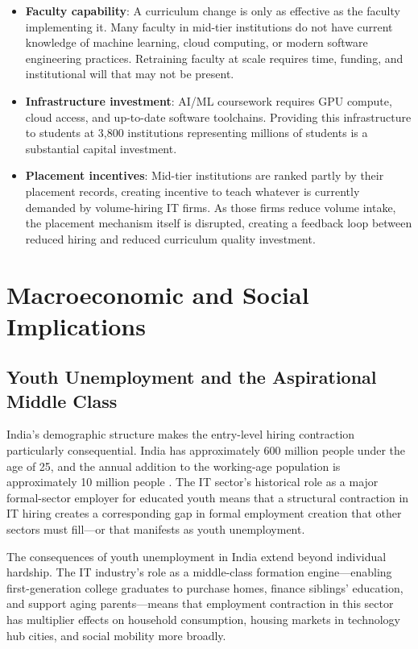 \documentclass[conference]{IEEEtran}
\begin{document}
\begin{itemize}
    \item \textbf{Faculty capability}: A curriculum change is only as effective as the faculty implementing it. Many faculty in mid-tier institutions do not have current knowledge of machine learning, cloud computing, or modern software engineering practices. Retraining faculty at scale requires time, funding, and institutional will that may not be present.
    \item \textbf{Infrastructure investment}: AI/ML coursework requires GPU compute, cloud access, and up-to-date software toolchains. Providing this infrastructure to students at 3,800 institutions representing millions of students is a substantial capital investment.
    \item \textbf{Placement incentives}: Mid-tier institutions are ranked partly by their placement records, creating incentive to teach whatever is currently demanded by volume-hiring IT firms. As those firms reduce volume intake, the placement mechanism itself is disrupted, creating a feedback loop between reduced hiring and reduced curriculum quality investment.
\end{itemize}

\section{Macroeconomic and Social Implications}
\label{sec:macro}

\subsection{Youth Unemployment and the Aspirational Middle Class}

India's demographic structure makes the entry-level hiring contraction particularly consequential. India has approximately 600 million people under the age of 25, and the annual addition to the working-age population is approximately 10 million people \cite{worldbank2024india}. The IT sector's historical role as a major formal-sector employer for educated youth means that a structural contraction in IT hiring creates a corresponding gap in formal employment creation that other sectors must fill---or that manifests as youth unemployment.

The consequences of youth unemployment in India extend beyond individual hardship. The IT industry's role as a middle-class formation engine---enabling first-generation college graduates to purchase homes, finance siblings' education, and support aging parents---means that employment contraction in this sector has multiplier effects on household consumption, housing markets in technology hub cities, and social mobility more broadly.
\end{document}
